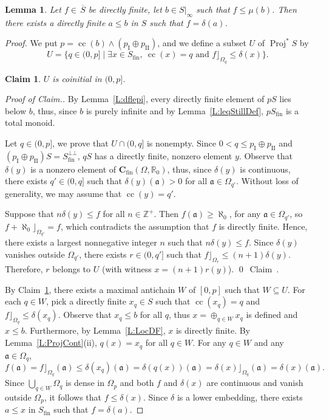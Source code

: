 \documentclass[psamsfonts,reqno]{memo-l}
\theoremstyle{plain}
\newtheorem{lemma}{Lemma}[section]
\newtheorem{claim}{Claim}
\theoremstyle{definition}
\theoremstyle{remark}
\newcommand{\qedc}{{\qed}~{\rm Claim~{\theclaim}.}}
\newenvironment{cproof}
{\begin{proof}[Proof of Claim.]}
{\qedc\renewcommand{\qed}{}\end{proof}}
\numberwithin{equation}{section}
\newcommand{\ol}[1]{\,\overline{\!#1}}
\newcommand{\DI}[1]{#1|_{\infty}}
\newcommand{\CC}{\mathbf{C}}
\newcommand{\fa}{\mathfrak{a}}
\newcommand{\fin}{\mathrm{fin}}
\newcommand{\I}{\mathrm{I}}
\newcommand{\II}{\mathrm{II}}
\newcommand{\ZZ}{\mathbb{Z}}
\newcommand{\RR}{\mathbb{R}}
\DeclareMathOperator{\cc}{cc}
\DeclareMathOperator{\BB}{Proj}
\newcommand{\BBp}[1]{\BB^*{#1}}
\newcommand{\set}[1]{\{#1\}}
\newcommand{\setm}[2]{\set{#1\mid#2}}
\begin{document}
\begin{lemma}\label{L:InSegf}
Let $f\in\ol{S}$ be directly finite, let $b\in\DI{S}$
such that $f\leq\mu(b)$. Then there exists a directly finite $a\leq b$ in $S$
such that $f=\delta(a)$.
\end{lemma}

\begin{proof}
We put $p=\cc(b)\wedge(p_{\I}\oplus p_{\II})$, and we define a subset $U$ of
$\BBp{S}$\index{pzzroj@$\BB{S}$} by
   \[
   U=\setm{q\in(0,p]}{\exists x\in S_\fin,\ \cc(x)=q\text{ and }
   f\rfloor_{\Omega_q}\leq\delta(x)}.
   \]

\setcounter{claim}{0}
\begin{claim}\label{Cl:weirdU}
$U$ is coinitial in $(0,p]$.
\end{claim}

\begin{cproof}
By Lemma~\ref{L:dflepi}, every directly finite
element of $pS$ lies below
$b$, thus, since $b$ is purely infinite and by Lemma~\ref{L:leqStillDef},
$pS_\fin$ is a total monoid.

Let $q\in(0,p]$, we prove that $U\cap(0,q]$ is nonempty. Since
$0<q\leq p_{\I}\oplus p_{\II}$ and
$(p_{\I}\oplus p_{\II})S=S_{\fin}^{\bot\bot}$, $qS$ has
a directly finite, nonzero element $y$. Observe that
$\delta(y)$ is a nonzero element of
$\CC_{\fin}(\Omega,\RR_0)$, thus, since $\delta(y)$ is continuous, there
exists
$q'\in(0,q]$ such that $\delta(y)(\fa)>0$ for all $\fa\in\Omega_{q'}$.
Without loss of generality, we may assume that $\cc(y)=q'$.

Suppose that $n\delta(y)\leq f$ for all $n\in\ZZ^+$. Then
$f(\fa)\geq\aleph_0$, for any $\fa\in\Omega_{q'}$, so
$f+\aleph_0\rfloor_{\Omega_{q'}}=f$, which contradicts the assumption that
$f$ is directly finite. Hence, there exists a largest
nonnegative integer $n$ such that $n\delta(y)\leq f$. Since $\delta(y)$
vanishes outside
$\Omega_{q'}$, there exists $r\in(0,q']$ such that
$f\rfloor_{\Omega_r}\leq(n+1)\delta(y)$. Therefore, $r$ belongs to $U$ (with
witness $x=(n+1)r(y)$).
\end{cproof}

By Claim~\ref{Cl:weirdU}, there exists a maximal antichain
$W$ of $[0,p]$ such that $W\subseteq U$. For each $q\in W$, pick
a directly finite
$x_q\in S$ such that $\cc(x_q)=q$ and $f\rfloor_{\Omega_q}\leq\delta(x_q)$.
Observe that $x_q\leq b$ for all $q$, thus $x=\oplus_{q\in W}x_q$ is defined
and $x\leq b$. Furthermore, by Lemma~\ref{L:LocDF}, $x$ is
 directly
finite. By Lemma~\ref{L:ProjCont}(ii), $q(x)=x_q$ for all $q\in W$. For any
$q\in W$ and any $\fa\in\Omega_q$,
   \[
   f(\fa)=f\rfloor_{\Omega_q}(\fa)\leq\delta(x_q)(\fa)=\delta(q(x))(\fa)
   =\delta(x)\rfloor_{\Omega_q}(\fa)=\delta(x)(\fa).
   \]
Since $\bigcup_{q\in W}\Omega_q$ is dense in $\Omega_p$ and both $f$ and
$\delta(x)$ are continuous and vanish outside $\Omega_p$, it follows that
$f\leq\delta(x)$. Since $\delta$ is a lower embedding, there exists $a\leq x$ in $S_\fin$ such that $f=\delta(a)$.
\end{proof}
\end{document}
